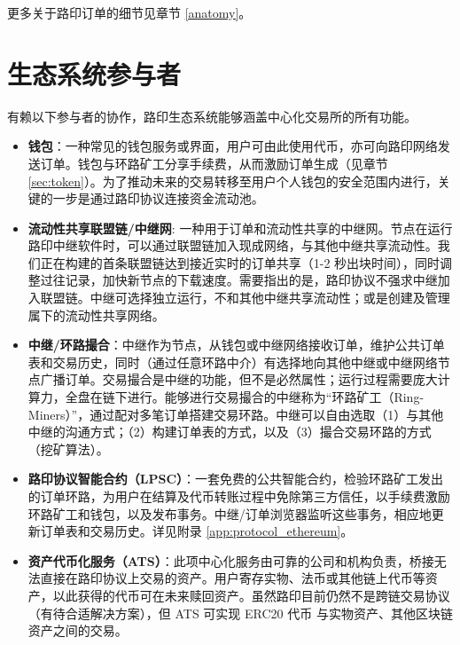 \documentclass[UTF8,nofonts]{ctexart}%
\begin{document}
\begin{multicols}{2}
更多关于路印订单的细节见章节 \ref{anatomy}。



\section{生态系统参与者\label{sec:ecosystem}}
有赖以下参与者的协作，路印生态系统能够涵盖中心化交易所的所有功能。

\begin{itemize}

\item \textbf{钱包}：一种常见的钱包服务或界面，用户可由此使用代币，亦可向路印网络发送订单。钱包与环路矿工分享手续费，从而激励订单生成（见章节 \ref{sec:token}）。为了推动未来的交易转移至用户个人钱包的安全范围内进行，关键的一步是通过路印协议连接资金流动池。

\item \textbf{流动性共享联盟链/中继网}: 一种用于订单和流动性共享的中继网。节点在运行路印中继软件时，可以通过联盟链加入现成网络，与其他中继共享流动性。我们正在构建的首条联盟链达到接近实时的订单共享（1-2 秒出块时间），同时调整过往记录，加快新节点的下载速度。需要指出的是，路印协议不强求中继加入联盟链。中继可选择独立运行，不和其他中继共享流动性；或是创建及管理属下的流动性共享网络。

\item \textbf{中继/环路撮合}：中继作为节点，从钱包或中继网络接收订单，维护公共订单表和交易历史，同时（通过任意环路中介）有选择地向其他中继或中继网络节点广播订单。交易撮合是中继的功能，但不是必然属性；运行过程需要庞大计算力，全盘在链下进行。能够进行交易撮合的中继称为\enquote{环路矿工（Ring-Miners）}，通过配对多笔订单搭建交易环路。中继可以自由选取（1）与其他中继的沟通方式；（2）构建订单表的方式，以及（3）撮合交易环路的方式（挖矿算法）。


\item \textbf{路印协议智能合约（LPSC）}：一套免费的公共智能合约，检验环路矿工发出的订单环路，为用户在结算及代币转账过程中免除第三方信任，以手续费激励环路矿工和钱包，以及发布事务。中继/订单浏览器监听这些事务，相应地更新订单表和交易历史。详见附录 \ref{app:protocol_ethereum}。

\item \textbf{资产代币化服务（ATS）}：此项中心化服务由可靠的公司和机构负责，桥接无法直接在路印协议上交易的资产。用户寄存实物、法币或其他链上代币等资产，以此获得的代币可在未来赎回资产。虽然路印目前仍然不是跨链交易协议（有待合适解决方案），但 ATS 可实现 ERC20 代币 \cite{ERC20} 与实物资产、其他区块链资产之间的交易。 


\end{itemize}
\end{multicols}
\end{document}
